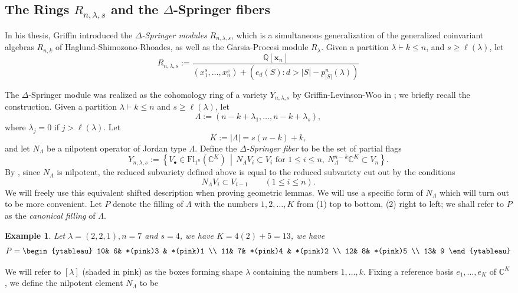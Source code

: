 \documentclass[11pt]{amsart}
\numberwithin{equation}{section}
\newtheorem{example}[theorem]{Example}
\theoremstyle{definition}
\newcommand{\CC}{{\mathbb{C}}}
\newcommand{\QQ}{{\mathbb{Q}}}
\newcommand{\xxx}{{\mathbf{x}}}
\newcommand{\Fl}{\text{Fl}}
\begin{document}
\subsection{The Rings $R_{n,\lambda,s}$ and the $\Delta$-Springer fibers}

In his thesis, Griffin introduced the \emph{$\Delta$-Springer modules} $R_{n,\lambda,s}$, which is a simultaneous generalization of the generalized coinvariant algebras $R_{n,k}$ of Haglund-Shimozono-Rhoades, as well as the Garsia-Procesi module $R_{\lambda}$. Given a partition $\lambda \vdash k \leq n$, and $s \geq \ell(\lambda)$, let
\[
R_{n,\lambda,s} := \frac{\QQ[\xxx_n]}{(x_1^s,\dots,x_n^s) + (e_d(S) : d > |S|-p^n_{|S|}(\lambda))}
\]

The $\Delta$-Springer module was realized as the cohomology ring of a variety
$Y_{n,\lambda,s}$ by Griffin-Levinson-Woo in \cite{GLW}; we briefly recall the
construction. Given a partition $\lambda\vdash k\leq n$ and $s\geq \ell(\lambda)$,
let
\[
\Lambda:=(n-k+\lambda_1,\dots,n-k+\lambda_s),
\]
where $\lambda_j=0$ if $j>\ell(\lambda)$. Let
\[
K:=|\Lambda|=s(n-k)+k,
\]
and let $N_\Lambda$ be a nilpotent operator of Jordan type $\Lambda$. Define the
\emph{$\Delta$-Springer fiber} to be the set of partial flags
\[
Y_{n,\lambda,s}:=\left\{V_\bullet\in \Fl_{1^n}(\CC^K)
\,\middle|\,
N_\Lambda V_i\subset V_i\text{ for }1\leq i\leq n,
\ N_\Lambda^{n-k}\CC^K\subset V_n\right\}.
\]
By \cite[Remark~3.2]{GLW}, since $N_\Lambda$ is nilpotent, the reduced
subvariety defined above is equal to the reduced subvariety cut out by the
conditions
\[
N_\Lambda V_i\subset V_{i-1}\qquad (1\leq i\leq n).
\]
We will freely use this equivalent shifted description when proving geometric
lemmas.
We will use a specific form of $N_\Lambda$ which will turn out to be more convenient. Let $P$ denote the filling of $\Lambda$ with the numbers $1,2,\dots,K$ from (1) top to bottom, (2) right to left; we shall refer to $P$ as the \emph{canonical filling} of $\Lambda$. 
\begin{example}\label{ex: P-diagram}
Let $\lambda = (2,2,1), n = 7$ and $s = 4$, we have $K = 4(2) + 5 = 13$, we have 
\[
P =
\begin{ytableau}
   10& 6& *(pink)3 & *(pink)1 \\
   11& 7& *(pink)4 & *(pink)2 \\
   12& 8& *(pink)5 \\
   13& 9
\end{ytableau}
\]
\end{example}
We will refer to $[\lambda]$ (shaded in pink) as the boxes forming shape $\lambda$ containing the numbers $1,\dots,k$. Fixing a reference basis $e_1,\dots,e_K$ of $\CC^K$, we define the nilpotent element $N_\Lambda$ to be
\end{document}
